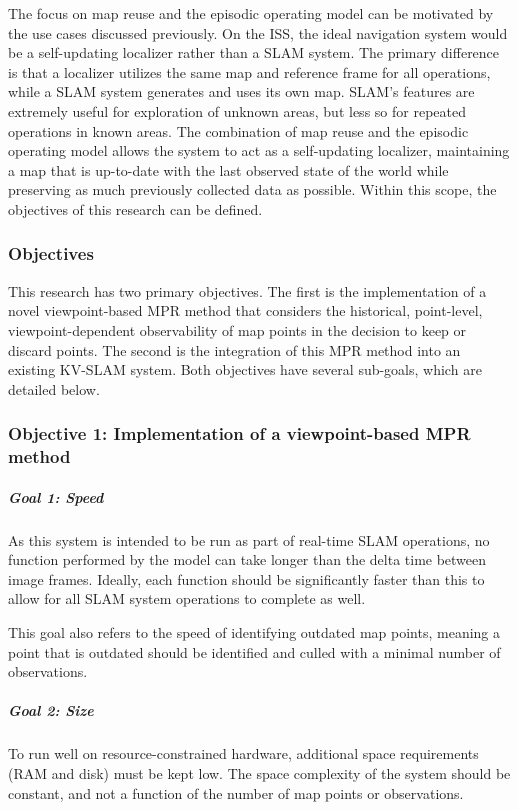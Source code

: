The focus on map reuse and the episodic operating model can be motivated by the use cases discussed previously. On the ISS, the ideal navigation system would be a self-updating localizer rather than a SLAM system. The primary difference is that a localizer utilizes the same map and reference frame for all operations, while a SLAM system generates and uses its own map. SLAM's features are extremely useful for exploration of unknown areas, but less so for repeated operations in known areas. The combination of map reuse and the episodic operating model allows the system to act as a self-updating localizer, maintaining a map that is up-to-date with the last observed state of the world while preserving as much previously collected data as possible. Within this scope, the objectives of this research can be defined.

\subsubsection*{Objectives}

This research has two primary objectives. The first is the implementation of a novel viewpoint-based MPR method that considers the historical, point-level, viewpoint-dependent observability of map points in the decision to keep or discard points. The second is the integration of this MPR method into an existing KV-SLAM system. Both objectives have several sub-goals, which are detailed below.

\subsubsection*{Objective 1: Implementation of a viewpoint-based MPR method}
\label{sec:objective_1}
\subparagraph{Goal 1: Speed}

As this system is intended to be run as part of real-time SLAM operations, no function performed by the model can take longer than the delta time between image frames. Ideally, each function should be significantly faster than this to allow for all SLAM system operations to complete as well.

This goal also refers to the speed of identifying outdated map points, meaning a point that is outdated should be identified and culled with a minimal number of observations.

\subparagraph{Goal 2: Size}

To run well on resource-constrained hardware, additional space requirements (RAM and disk) must be kept low. The space complexity of the system should be constant, and not a function of the number of map points or observations.


